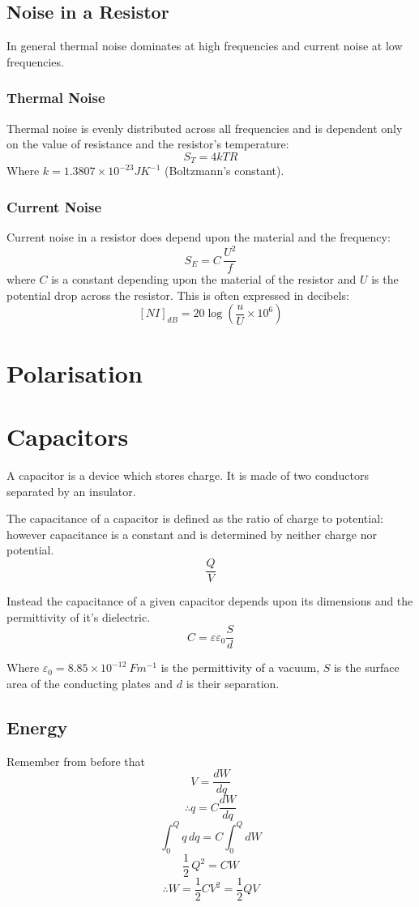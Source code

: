 \documentclass[11pt,a4paper]{report}
\begin{document}
\subsection{Noise in a Resistor}
In general thermal noise dominates at high frequencies and current noise at low frequencies.
\subsubsection{Thermal Noise}
Thermal noise is evenly distributed across all frequencies and is dependent only on the value of resistance and the resistor's temperature:
\[S_T = 4kTR\]
Where $k = 1.3807 \times 10^{-23} JK^{-1}$ (Boltzmann's constant). 

\subsubsection{Current Noise}
Current noise in a resistor does depend upon the material and the frequency:
\[S_E = C \, \frac{U^2}{f}\] where $C$ is a constant depending upon the material of the resistor and $U$ is the potential drop across the resistor.
This is often expressed in decibels:
\[[NI]_{dB} = 20 \log \left( \frac{u}{U} \times 10^6 \right)\]

\section{Polarisation}

\section{Capacitors}
A capacitor is a device which stores charge. It is made of two conductors separated by an insulator.

The capacitance of a capacitor is defined as the ratio of charge to potential: however capacitance is a constant and is determined by neither charge nor potential.
\[\frac{Q}{V}\]

Instead the capacitance of a given capacitor depends upon its dimensions and the permittivity of it's dielectric.
\[C=\varepsilon \varepsilon_0 \frac{S}{d}\]

Where $\varepsilon_0 = 8.85 \times10^{-12} \: Fm^{-1}$ is the permittivity of a vacuum, $S$ is the surface area of the conducting plates and $d$ is their separation.

\subsection{Energy}
Remember from before that 
\[V=\frac{dW}{dq}\]
\[\therefore q=C\frac{dW}{dq}\]
\[\int_0^Q q \, dq = C \int_0^Q dW\]
\[\frac{1}{2} \, Q^2 = CW\]
\[\therefore W=\frac{1}{2}CV^2=\frac{1}{2}QV\]
\end{document}
